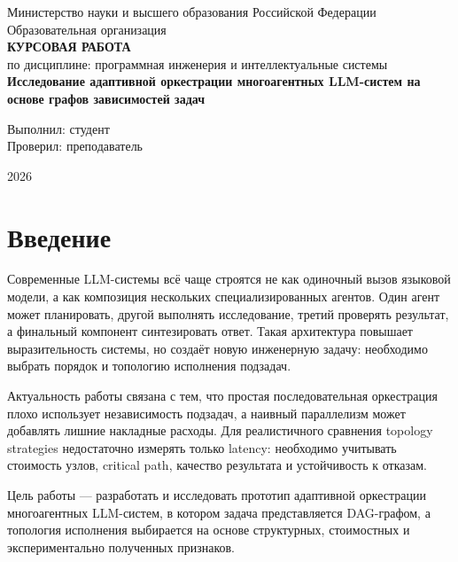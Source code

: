 \documentclass[12pt,a4paper]{report}
\begin{document}
\begin{titlepage}
\begin{center}
Министерство науки и высшего образования Российской Федерации\\
Образовательная организация\\[2cm]

\textbf{КУРСОВАЯ РАБОТА}\\[0.5cm]
по дисциплине: программная инженерия и интеллектуальные системы\\[1cm]

\textbf{Исследование адаптивной оркестрации многоагентных LLM-систем на основе графов зависимостей задач}\\[2cm]
\end{center}

\begin{flushright}
Выполнил: студент\\
Проверил: преподаватель\\
\end{flushright}

\vfill
\begin{center}
2026
\end{center}
\end{titlepage}

\tableofcontents
\clearpage

\chapter*{Введение}

Современные LLM-системы всё чаще строятся не как одиночный вызов языковой модели, а как композиция нескольких специализированных агентов. Один агент может планировать, другой выполнять исследование, третий проверять результат, а финальный компонент синтезировать ответ. Такая архитектура повышает выразительность системы, но создаёт новую инженерную задачу: необходимо выбрать порядок и топологию исполнения подзадач.

Актуальность работы связана с тем, что простая последовательная оркестрация плохо использует независимость подзадач, а наивный параллелизм может добавлять лишние накладные расходы. Для реалистичного сравнения topology strategies недостаточно измерять только latency: необходимо учитывать стоимость узлов, critical path, качество результата и устойчивость к отказам.

Цель работы --- разработать и исследовать прототип адаптивной оркестрации многоагентных LLM-систем, в котором задача представляется DAG-графом, а топология исполнения выбирается на основе структурных, стоимостных и экспериментально полученных признаков.
\end{document}
